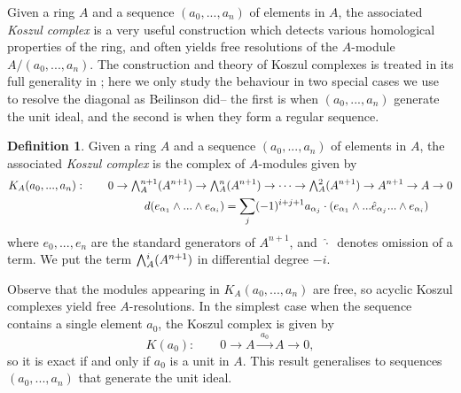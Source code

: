 \documentclass[a4paper]{article}
\theoremstyle{definition}
\newtheorem{defn}{Definition}[section]
\theoremstyle{remark}
\newcommand{\Exter}{\mathchoice{{\textstyle\bigwedge}}%
    {{\bigwedge}}%
    {{\textstyle\wedge}}%
    {{\scriptstyle\wedge}}}
\begin{document}
Given a ring \(A\) and a sequence \((a_0,...,a_n)\) of elements in \(A\), the
associated \textit{Koszul complex} is a very useful construction which detects
various homological properties of the ring, and often yields free resolutions of
the \(A\)-module \(A/(a_0,...,a_n)\). The construction and theory of Koszul
complexes is treated in its full generality in
; here we only study the behaviour in two
special cases we use to resolve the diagonal as Beilinson did-- the first is
when \((a_0,...,a_n)\) generate the unit ideal, and the second is when they form
a regular sequence.  
\begin{defn}\label{koszulcomplexdefn}
Given a ring \(A\) and a sequence \((a_0,...,a_n)\) of elements in \(A\), the
associated \textit{Koszul complex} is the complex of \(A\)-modules given by
\begin{gather*}
    K_A(a_0,...,a_n) : \qquad 0\rightarrow \Exter_A^{n+1}(A^{n+1}) \rightarrow
    \Exter_A^n(A^{n+1}) \rightarrow
    \cdots \rightarrow \Exter_A^2(A^{n+1})\rightarrow A^{n+1} \rightarrow
    A \rightarrow 0  \\ 
    \qquad \qquad \qquad \qquad \qquad 
    d(e_{\alpha_1}\wedge...\wedge e_{\alpha_i}) = \sum_j
    (-1)^{i+j+1}a_{\alpha_j}\cdot (e_{\alpha_1} \wedge ...\hat{e}_{\alpha_j}...
    \wedge e_{\alpha_i})
\end{gather*}
where \(e_0,...,e_n\) are the standard generators of \(A^{n+1}\), and
\(\,\hat{\cdot}\,\) denotes omission of a term. We put the term
\(\Exter^i_A(A^{n+1})\) in differential degree \(-i\).
\end{defn}

Observe that the modules appearing in \(K_A(a_0,...,a_n)\) are free, so
acyclic Koszul complexes yield free \(A\)-resolutions. In the simplest case when
the sequence contains a single element \(a_0\), the Koszul complex is given by 
\[K(a_0):\qquad 0\rightarrow A \xrightarrow{\;a_0\; }A\rightarrow 0,\]
so it is exact if and only if \(a_0\) is a unit in \(A\). This result
generalises to sequences \((a_0,...,a_n)\) that generate the unit ideal.
\end{document}

